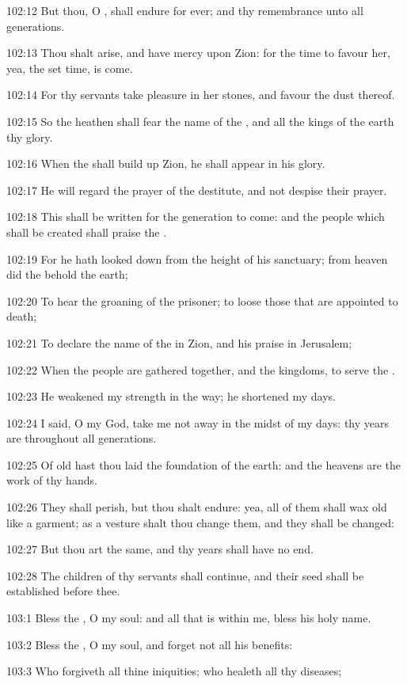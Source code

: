 102:12 But thou, O \LORD, shall endure for ever; and thy remembrance
unto all generations.

102:13 Thou shalt arise, and have mercy upon Zion: for the time to
favour her, yea, the set time, is come.

102:14 For thy servants take pleasure in her stones, and favour the
dust thereof.

102:15 So the heathen shall fear the name of the \LORD, and all the
kings of the earth thy glory.

102:16 When the \LORD shall build up Zion, he shall appear in his
glory.

102:17 He will regard the prayer of the destitute, and not despise
their prayer.

102:18 This shall be written for the generation to come: and the
people which shall be created shall praise the \LORD.

102:19 For he hath looked down from the height of his sanctuary; from
heaven did the \LORD behold the earth;

102:20 To hear the groaning of the prisoner; to loose those that are
appointed to death;

102:21 To declare the name of the \LORD in Zion, and his praise in
Jerusalem;

102:22 When the people are gathered together, and the kingdoms, to
serve the \LORD.

102:23 He weakened my strength in the way; he shortened my days.

102:24 I said, O my God, take me not away in the midst of my days: thy
years are throughout all generations.

102:25 Of old hast thou laid the foundation of the earth: and the
heavens are the work of thy hands.

102:26 They shall perish, but thou shalt endure: yea, all of them
shall wax old like a garment; as a vesture shalt thou change them, and
they shall be changed:

102:27 But thou art the same, and thy years shall have no end.

102:28 The children of thy servants shall continue, and their seed
shall be established before thee.



103:1 Bless the \LORD, O my soul: and all that is within me, bless his
holy name.

103:2 Bless the \LORD, O my soul, and forget not all his benefits:

103:3 Who forgiveth all thine iniquities; who healeth all thy
diseases;

